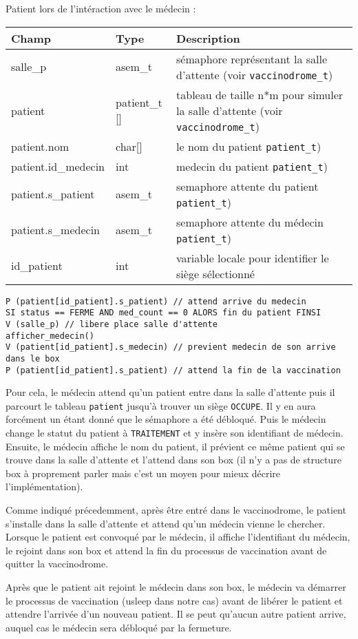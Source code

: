 \documentclass[a4paper]{article}
\begin{document}
Patient lors de l'intéraction avec le médecin :
\bigskip \newline
\begin{tabularx}{\linewidth}{|l|l|>{\strut}X|}
  \hline%
  Champ & Type & Description \\ \hline%
  salle\_p & asem\_t & sémaphore représentant la salle d'attente (voir \texttt{vaccinodrome\_t}) \\ \hline%
  patient & patient\_t [] & tableau de taille n*m pour simuler la salle d’attente (voir \texttt{vaccinodrome\_t})  \\ \hline%
  patient.nom & char[] & le nom du patient \texttt{patient\_t})\\ \hline%
  patient.id\_medecin & int & medecin du patient \texttt{patient\_t})\\ \hline%
  patient.s\_patient & asem\_t & semaphore attente du patient \texttt{patient\_t}) \\ \hline%
  patient.s\_medecin & asem\_t & semaphore attente du médecin \texttt{patient\_t})\\ \hline%
  id\_patient & int & variable locale pour identifier le siège sélectionné \\ \hline%
\end{tabularx}

\begin{verbatim}
P (patient[id_patient].s_patient) // attend arrive du medecin
SI status == FERME AND med_count == 0 ALORS fin du patient FINSI
V (salle_p) // libere place salle d'attente
afficher_medecin()
V (patient[id_patient].s_medecin) // previent medecin de son arrive dans le box
P (patient[id_patient].s_patient) // attend la fin de la vaccination
\end{verbatim}

\medskip \par Pour cela, le médecin attend qu'un patient entre dans la salle d'attente puis il parcourt le tableau \texttt{patient} jusqu'à trouver un siège \texttt{OCCUPE}. Il y en aura forcément un étant donné que le sémaphore a été débloqué. Puis le médecin change le statut du patient à \texttt{TRAITEMENT} et y insère son identifiant de médecin. Ensuite, le médecin affiche le nom du patient, il prévient ce même patient qui se trouve dans la salle d'attente et l'attend dans son box (il n'y a pas de structure box à proprement parler mais c'est un moyen pour mieux décrire l'implémentation).
\medskip \par Comme indiqué précedemment, après être entré dans le vaccinodrome, le patient s'installe dans la salle d'attente et attend qu'un médecin vienne le chercher. Lorsque le patient est convoqué par le médecin, il affiche l'identifiant du médecin, le rejoint dans son box et attend la fin du processus de vaccination avant de quitter la vaccinodrome.
\medskip \par Après que le patient ait rejoint le médecin dans son box, le médecin va démarrer le processus de vaccination (usleep dans notre cas) avant de libérer le patient et attendre l'arrivée d'un nouveau patient. Il se peut qu'aucun autre patient arrive, auquel cas le médecin sera débloqué par la fermeture.
\end{document}
